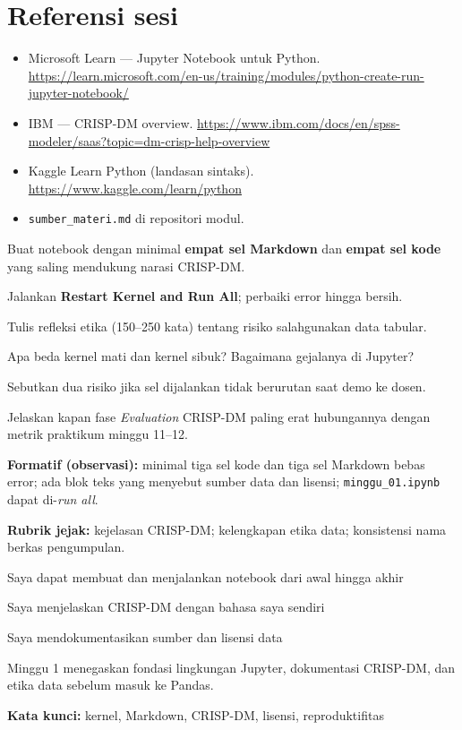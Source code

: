 \documentclass[../main.tex]{subfiles}
\begin{document}
\section{Referensi sesi}

\begin{itemize}[leftmargin=*]
  \item Microsoft Learn --- Jupyter Notebook untuk Python. \url{https://learn.microsoft.com/en-us/training/modules/python-create-run-jupyter-notebook/}
  \item IBM --- CRISP-DM overview. \url{https://www.ibm.com/docs/en/spss-modeler/saas?topic=dm-crisp-help-overview}
  \item Kaggle Learn Python (landasan sintaks). \url{https://www.kaggle.com/learn/python}
  \item \texttt{sumber\_materi.md} di repositori modul.
\end{itemize}

\begin{aktivitas}
  \item Buat notebook dengan minimal \textbf{empat sel Markdown} dan \textbf{empat sel kode} yang saling mendukung narasi CRISP-DM.
  \item Jalankan \textbf{Restart Kernel and Run All}; perbaiki error hingga bersih.
  \item Tulis refleksi etika (150--250 kata) tentang risiko salahgunakan data tabular.
\end{aktivitas}

\begin{latihan}
  \item Apa beda kernel mati dan kernel sibuk? Bagaimana gejalanya di Jupyter?
  \item Sebutkan dua risiko jika sel dijalankan tidak berurutan saat demo ke dosen.
  \item Jelaskan kapan fase \textit{Evaluation} CRISP-DM paling erat hubungannya dengan metrik praktikum minggu 11--12.
\end{latihan}

\begin{asesmen}
\textbf{Formatif (observasi):} minimal tiga sel kode dan tiga sel Markdown bebas error; ada blok teks yang menyebut sumber data dan lisensi; \texttt{minggu\_01.ipynb} dapat di-\textit{run all}.

\textbf{Rubrik jejak:} kejelasan CRISP-DM; kelengkapan etika data; konsistensi nama berkas pengumpulan.
\end{asesmen}

\begin{checklist}
  \item Saya dapat membuat dan menjalankan notebook dari awal hingga akhir
  \item Saya menjelaskan CRISP-DM dengan bahasa saya sendiri
  \item Saya mendokumentasikan sumber dan lisensi data
\end{checklist}

\begin{rangkuman}
Minggu 1 menegaskan fondasi lingkungan Jupyter, dokumentasi CRISP-DM, dan etika data sebelum masuk ke Pandas.

\textbf{Kata kunci:} kernel, Markdown, CRISP-DM, lisensi, reproduktifitas
\end{rangkuman}
\end{document}
